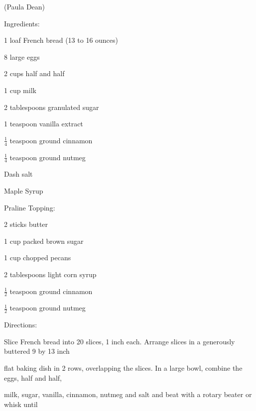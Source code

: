 \documentclass[a4paper,portrait,12pt]{book}
\begin{document}
(Paula Dean)




Ingredients:




1 loaf French bread (13 to 16 ounces)




8 large eggs




2 cups half and half




1 cup milk




2 tablespoons granulated sugar




1 teaspoon vanilla extract




$\frac{1}{4}$ teaspoon ground cinnamon




$\frac{1}{4}$ teaspoon ground nutmeg




Dash salt




Maple Syrup




Praline Topping:




2 sticks butter




1 cup packed brown sugar




1 cup chopped pecans




2 tablespoons light corn syrup




$\frac{1}{2}$ teaspoon ground cinnamon




$\frac{1}{2}$ teaspoon ground nutmeg




Directions:




Slice French bread into 20 slices, 1 inch each. Arrange slices in a generously buttered 9 by 13 inch




flat baking dish in 2 rows, overlapping the slices. In a large bowl, combine the eggs, half and half,




milk, sugar, vanilla, cinnamon, nutmeg and salt and beat with a rotary beater or whisk until
\end{document}
